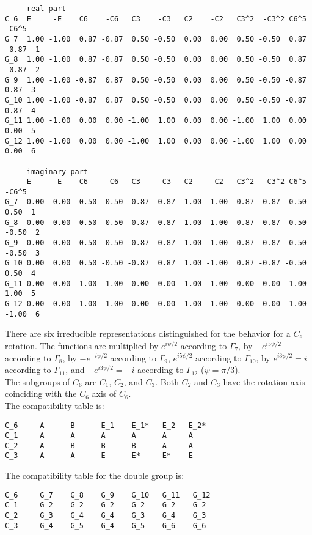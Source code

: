 \documentclass[12pt,a4paper]{article}
\begin{document}
\begin{footnotesize}
\begin{verbatim}
     real part
C_6  E     -E    C6    -C6   C3    -C3   C2    -C2   C3^2  -C3^2 C6^5  -C6^5
G_7  1.00 -1.00  0.87 -0.87  0.50 -0.50  0.00  0.00  0.50 -0.50  0.87 -0.87  1
G_8  1.00 -1.00  0.87 -0.87  0.50 -0.50  0.00  0.00  0.50 -0.50  0.87 -0.87  2
G_9  1.00 -1.00 -0.87  0.87  0.50 -0.50  0.00  0.00  0.50 -0.50 -0.87  0.87  3  
G_10 1.00 -1.00 -0.87  0.87  0.50 -0.50  0.00  0.00  0.50 -0.50 -0.87  0.87  4
G_11 1.00 -1.00  0.00  0.00 -1.00  1.00  0.00  0.00 -1.00  1.00  0.00  0.00  5
G_12 1.00 -1.00  0.00  0.00 -1.00  1.00  0.00  0.00 -1.00  1.00  0.00  0.00  6

     imaginary part
     E     -E    C6    -C6   C3    -C3   C2    -C2   C3^2  -C3^2 C6^5  -C6^5
G_7  0.00  0.00  0.50 -0.50  0.87 -0.87  1.00 -1.00 -0.87  0.87 -0.50  0.50  1
G_8  0.00  0.00 -0.50  0.50 -0.87  0.87 -1.00  1.00  0.87 -0.87  0.50 -0.50  2
G_9  0.00  0.00 -0.50  0.50  0.87 -0.87 -1.00  1.00 -0.87  0.87  0.50 -0.50  3
G_10 0.00  0.00  0.50 -0.50 -0.87  0.87  1.00 -1.00  0.87 -0.87 -0.50  0.50  4
G_11 0.00  0.00  1.00 -1.00  0.00  0.00 -1.00  1.00  0.00  0.00 -1.00  1.00  5
G_12 0.00  0.00 -1.00  1.00  0.00  0.00  1.00 -1.00  0.00  0.00  1.00 -1.00  6
\end{verbatim}
\end{footnotesize}
There are six irreducible representations distinguished for the
behavior for a $C_6$ rotation. The functions are multiplied
by $e^{i\psi/2}$ according to $\Gamma_7$, by $-e^{i5\psi/2}$ 
according to $\Gamma_8$,
by $-e^{-i\psi/2}$ according to $\Gamma_9$, $e^{i5\psi/2}$ 
according to $\Gamma_{10}$,
by $e^{i3\psi/2}=i$ according to $\Gamma_{11}$, and $-e^{i3\psi/2}=-i$ according 
to $\Gamma_{12}$ ($\psi=\pi/3$). \\
The subgroups of $C_6$ are $C_1$, $C_2$, and $C_3$. Both $C_2$ and $C_3$ have
the rotation axis coinciding with the $C_6$ axis of $C_6$. \\
The compatibility table is:
\begin{verbatim}
C_6     A      B      E_1    E_1*   E_2   E_2* 
C_1     A      A      A      A      A     A
C_2     A      B      B      B      A     A
C_3     A      A      E      E*     E*    E
\end{verbatim}
The compatibility table for the double group is:
\begin{verbatim}
C_6     G_7    G_8    G_9    G_10   G_11   G_12 
C_1     G_2    G_2    G_2    G_2    G_2    G_2
C_2     G_3    G_4    G_4    G_3    G_4    G_3
C_3     G_4    G_5    G_4    G_5    G_6    G_6
\end{verbatim}
\end{document}

